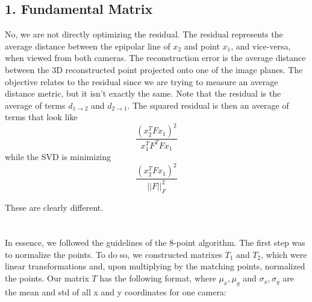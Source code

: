 \documentclass{article}\usepackage{amsmath,amssymb,amsthm,tikz,tkz-graph,color,chngpage,soul,hyperref,csquotes,graphicx,floatrow}\newcommand*{\QEDB}{\hfill\ensuremath{\square}}\newtheorem*{prop}{Proposition}\renewcommand{\theenumi}{\alph{enumi}}\usepackage[shortlabels]{enumitem}\usepackage[nobreak=true]{mdframed}\usetikzlibrary{matrix,calc}\MakeOuterQuote{"}\usepackage[margin=0.95in]{geometry} \newtheorem{theorem}{Theorem}
\begin{document}
\subsection*{1. Fundamental Matrix}
\begin{mdframed}
No, we are not directly optimizing the residual. The residual represents the average distance between the epipolar line of $ x_2$ and point $ x_1 $, and vice-versa, when viewed from both cameras. The reconstruction error is the average distance between the 3D reconstructed point projected onto one of the image planes. The objective relates to the residual since we are trying to measure an average distance metric, but it isn't exactly the same. Note that the residual is the average of terms $d_{1 \rightarrow 2}$ and $d_{2 \rightarrow 1}$. The squared residual is then an average of terms that look like 
$$\frac{(x_2^TFx_1)^2}{x_1^TF^TFx_1}$$
while the SVD is minimizing
$$\frac{(x_2^TFx_1)^2}{||F||_F^2}$$

These are clearly different. \\\\\\

In essence, we followed the guidelines of the 8-point algorithm. The first step was to normalize the points. To do so, we constructed matrixes $ T_1 $ and $ T_2 $, which were linear transformations and, upon multiplying by the matching points, normalized the points. Our matrix $ T $ has the following format, where $ \mu_x, \mu_y $ and $ \sigma_x, \sigma_y $ are the mean and std of all x and y coordinates for one camera:


\end{mdframed}
\end{document}
